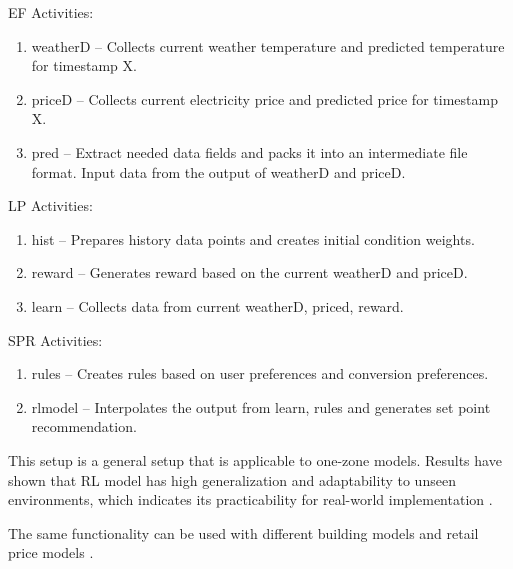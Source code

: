 EF Activities:

\begin{enumerate}
\item weatherD -- Collects current weather temperature and predicted temperature for timestamp X.
\item priceD -- Collects current electricity price and predicted price for timestamp X.
\item pred -- Extract needed data fields and packs it into an intermediate file format. Input data from the output of weatherD and priceD.
\end{enumerate}


LP Activities:

\begin{enumerate}
\item hist -- Prepares history data points and creates initial condition weights.
\item reward -- Generates reward based on the current weatherD and priceD.
\item learn -- Collects data from current weatherD, priced, reward.
\end{enumerate}

SPR Activities:

\begin{enumerate}
\item rules -- Creates rules based on user preferences and conversion preferences.
\item rlmodel --  Interpolates the output from learn, rules and generates set point recommendation.
\end{enumerate}

This setup is a general setup that is applicable to one-zone models. Results have shown that RL model has high generalization and adaptability to unseen environments, which indicates its practicability for real-world implementation \cite{du2021intelligent}.

The same functionality can be used with different building models and retail price models \cite{du2021intelligent}. 






